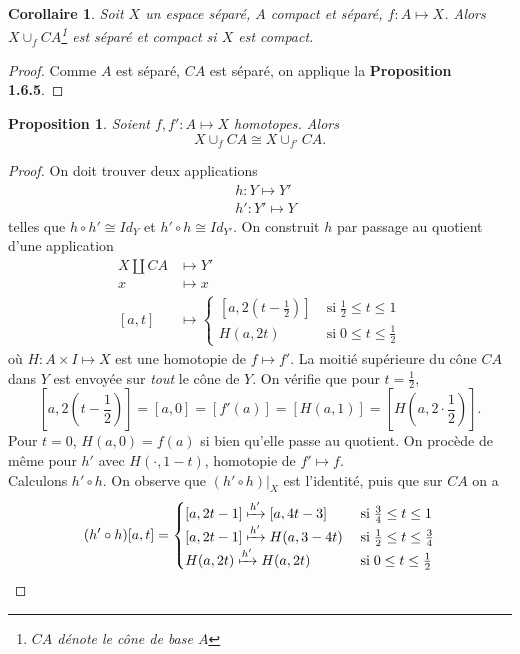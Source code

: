 \documentclass[12pt]{book}
\newtheorem{cor}[lemma]{Corollaire}
\newtheorem{prop}[lemma]{Proposition}
\theoremstyle{definition}
\theoremstyle{remark}
\begin{document}
	\begin{cor}
		Soit $X$ un espace séparé, $A$ compact et séparé, $f : A\longmapsto X$. Alors $X \cup_f CA$\footnote{$CA$ dénote le cône de base  $A$} est séparé et compact si $X$ est compact.
	\end{cor}
	\begin{proof}
		Comme $A$ est séparé, $CA$ est séparé, on applique la \textbf{Proposition 1.6.5}.
	\end{proof}
	\begin{prop}
		Soient $f,f' : A \longmapsto X$ homotopes. Alors \[
			X \cup_f CA \cong X \cup_{f'} CA
		.\] 
	\end{prop}
	\begin{proof}
		On doit trouver deux applications
		\begin{align*}
			&h : Y \longmapsto Y' \\
			&h' : Y' \longmapsto Y
		\end{align*}
		telles que $h\circ h' \cong Id_Y$ et $h'\circ h \cong Id_{Y'}$. 
		On construit $h$ par passage au quotient d'une application 
		 \begin{align*}
			 X \amalg CA &\longmapsto Y' \\
				 x&\longmapsto x \\
				 [a,t]& \longmapsto \begin{cases}
					 [a,2(t-\frac{1}{2})] \; &\text{si} \; \frac{1}{2} \le t \le 1 \\
					 H(a,2t) \; &\text{si} \; 0 \le t \le \frac{1}{2}
			 \end{cases}
		\end{align*}
		où $H : A \times I \longmapsto X$ est une homotopie de $f \longmapsto f'$.
		La moitié supérieure du cône $CA$ dans $Y$ est envoyée sur \emph{tout} le cône de $Y$. On vérifie que pour $t=\frac{1}{2}$, \[[a,2(t-\frac{1}{2})] = [a,0] = [f'(a)] = [H(a,1)] = [H(a,2\cdot \frac{1}{2})].\]
		Pour $t=0$, $H(a,0) = f(a)$ si bien qu'elle passe au quotient. On procède de même pour $h'$ avec $H(\cdot , 1-t)$, homotopie de  $f' \longmapsto f$. \\
		Calculons $h' \circ h$. On observe que $(h'\circ h)|_X$ est l'identité, puis que sur $CA$ on a \[
			(h'\circ h)[a,t] = \begin{cases}
				[a,2t-1] \xmapsto{h'} [a,4t-3] \; &\text{si} \; \frac{3}{4} \le t \le 1 \\
				[a,2t-1] \xmapsto{h'} H(a,3-4t) \; &\text{si} \; \frac{1}{2} \le t \le \frac{3}{4} \\
				H(a,2t) \xmapsto{h'} H(a,2t) \; &\text{si} \; 0 \le t \le \frac{1}{2}

\end{cases}\]
\end{proof}
\end{document}

